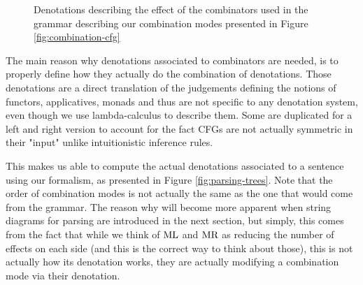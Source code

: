 \begin{figure}
	
	\caption{Denotations describing the effect of the combinators used in the
		grammar describing our combination modes presented in
		Figure \ref{fig:combination-cfg}}
	\label{fig:combinator-denotations}
\end{figure}

The main reason why denotations associated to combinators are needed, is to
properly define how they actually do the combination of denotations.
Those denotations are a direct translation of the judgements defining the
notions of functors, applicatives, monads and thus are not specific to any
denotation system, even though we use lambda-calculus to describe them.
Some are duplicated for a left and right version to account for the fact CFGs
are not actually symmetric in their "input" unlike intuitionistic inference
rules.

This makes us able to compute the actual denotations associated to a sentence
using our formalism, as presented in Figure \ref{fig:parsing-trees}.
Note that the order of combination modes is not actually the same as the one
that would come from the grammar.
The reason why will become more apparent when string diagrams for parsing are
introduced in the next section, but simply, this comes from the fact that while
we think of $\text{ML}$ and $\text{MR}$ as reducing the number of effects on each
side (and this is the correct way to think about those), this is not actually
how its denotation works, they are actually modifying a combination mode via
their denotation.

